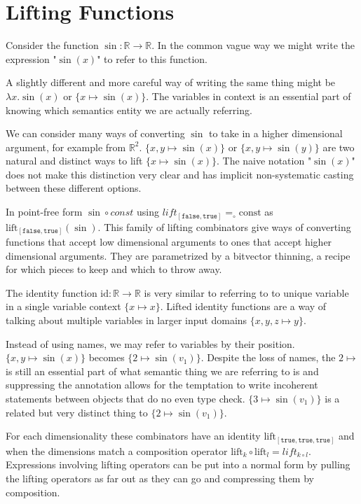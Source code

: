 \documentclass{article}%
\newcommand{\bR}{\mathbb{R}}
\newcommand{\true}{\ensuremath{\mathtt{true}}}
\newcommand{\false}{\ensuremath{\mathtt{false}}}
\begin{document}
\section{Lifting Functions}

Consider the function $\sin : \mathbb{R} \rightarrow \mathbb{R}$. In the common vague way we might write the expression "$\sin(x)$" to refer to this function. 

A slightly different and more careful way of writing the same thing might be $\lambda x. \sin(x)$ or $\{ x \mapsto \sin(x) \}$. The variables in context is an essential part of knowing which semantics entity we are actually referring.

We can consider many ways of converting $\sin$ to take in a higher dimensional argument, for example from $\mathbb{R}^2$.  $\{ x,y \mapsto \sin(x) \}$ or $\{ x,y \mapsto \sin(y) \}$ are two natural and distinct ways to lift $\{ x \mapsto \sin(x) \}$. The naive notation "$\sin(x)$" does not make this distinction very clear and has implicit non-systematic casting between these different options.

In point-free form $\sin \circ const$ using $lift_{[\false, \true]} = _ \circ \text{const}$ as $\text{lift}_{[\false, \true]}(\sin)$. This family of lifting combinators give ways of converting functions that accept low dimensional arguments to ones that accept higher dimensional arguments. They are parametrized by a bitvector thinning, a recipe for which pieces to keep and which to throw away.

The identity function $\text{id} : \bR \rightarrow \bR$ is very similar to referring to to unique variable in a single variable context $\{ x \mapsto x \}$. Lifted identity functions are a way of talking about multiple variables in larger input domains  $\{ x,y,z \mapsto y \}$.

Instead of using names, we may refer to variables by their position. $\{ x,y \mapsto \sin(x) \}$ becomes $\{ 2 \mapsto \sin(v_1) \}$. Despite the loss of names, the $2 \mapsto$ is still an essential part of what semantic thing we are referring to is and suppressing the annotation allows for the temptation to write incoherent statements between objects that do no even type check. $\{3 \mapsto \sin(v_1) \}$ is a related but very distinct thing to $\{ 2 \mapsto \sin(v_1) \}$.

For each dimensionality these combinators have an identity $\text{lift}_{[\true, \true, \true]}$ and when the dimensions match a composition operator $\text{lift}_k \circ \text{lift}_l = lift_{k \circ l}$.
Expressions involving lifting operators can be put into a normal form by pulling the lifting operators as far out as they can go and compressing them by composition.
\end{document}
